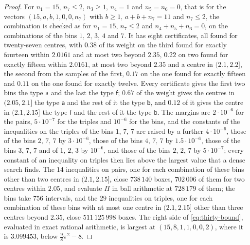 \documentclass[11pt,reqno]{amsart}
\renewcommand{\_}{\origunderscore\allowbreak}
\numberwithin{equation}{section}
\theoremstyle{plain}
\theoremstyle{definition}
\theoremstyle{remark}
\begin{document}
\begin{proof}
For $n_1=15$, $n_7\le2$, $n_3\ge1$, $n_4=1$ and $n_5=n_6=0$, that is
for the vectors $(15,a,b,1,0,0,n_7)$ with $b\ge1$, $a+b+n_7=11$ and
$n_7\le2$, the combination is checked as for $n_1=15$, $n_7\le2$ and
$n_4+n_5+n_6=0$, on the combinations of the bins $1$, $2$, $3$, $4$ and
$7$. It has eight certificates, all found for twenty-seven centres, with
$0.38$ of its weight on the third found for exactly fourteen within
$2.0161$ and at most two beyond $2.35$, $0.22$ on two found for exactly
fifteen within $2.0161$, at most two beyond $2.35$ and a centre in
$(2.1,2.2]$, the second from the samples of the first, $0.17$ on the one
found for exactly fifteen and $0.11$ on the one found for exactly twelve.
Every certificate gives the first two bins the type $\mathsf a$ and the
last the type $\mathsf f$; $0.67$ of the weight gives the centres in
$(2.05,2.1]$ the type $\mathsf a$ and the rest of it the type
$\mathsf b$, and $0.12$ of it gives the centre in $(2.1,2.15]$ the type
$\mathsf f$ and the rest of it the type $\mathsf b$. The margins are
$2\cdot10^{-6}$ for the pairs, $5\cdot10^{-7}$ for the triples and
$10^{-6}$ for the bins, and the constants of the inequalities on the
triples of the bins $1$, $7$, $7$ are raised by a further $4\cdot10^{-6}$,
those of the bins $2$, $7$, $7$ by $3\cdot10^{-6}$, those of the bins
$4$, $7$, $7$ by $1.5\cdot10^{-6}$, those of the bins $3$, $7$, $7$ and
of $1$, $2$, $3$ by $10^{-6}$, and those of the bins $2$, $2$, $7$ by
$5\cdot10^{-7}$; every constant of an inequality on triples then lies
above the largest value that a dense search finds. The $14$ inequalities
on pairs, one for each combination of these bins other than two centres in
$(2.1,2.15]$, close $738\,140$ boxes, $702\,006$ of them for two centres
within $2.05$, and evaluate $\Pi$ in ball arithmetic at $728\,179$ of
them; the bins take $756$ intervals, and the $29$ inequalities on triples,
one for each combination of these bins with at most one centre in
$(2.1,2.15]$ other than three centres beyond $2.35$, close
$511\,125\,998$ boxes. The right side of \eqref{eq:thirty-bound},
evaluated in exact rational arithmetic, is largest at $(15,8,1,1,0,0,2)$,
where it is $3.099453$, below $\frac98\pi^2-8$.


\end{proof}
\end{document}
